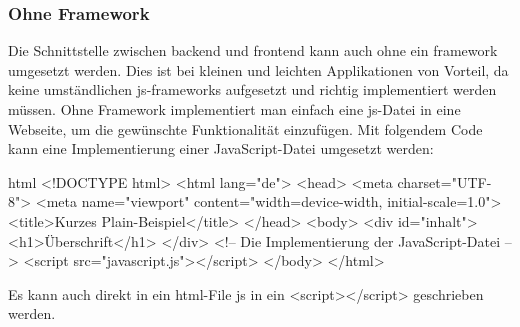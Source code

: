 \subsubsection{Ohne Framework}
Die Schnittstelle zwischen \Gls{backend} und \Gls{frontend} kann auch ohne ein \Gls{framework} umgesetzt werden. Dies ist bei kleinen und leichten Applikationen von Vorteil, da keine umständlichen \Gls{js}-\Gls{framework}s aufgesetzt und richtig implementiert werden müssen. Ohne Framework implementiert man einfach eine \Gls{js}-Datei in eine Webseite, um die gewünschte Funktionalität einzufügen. Mit folgendem Code kann eine Implementierung einer JavaScript-Datei umgesetzt werden:
\begin{code}{html}
	<!DOCTYPE html>
	<html lang="de">
		<head>
			<meta charset="UTF-8">
			<meta name="viewport" content="width=device-width, initial-scale=1.0">
			<title>Kurzes Plain-Beispiel</title>
		</head>
		<body>
			<div id="inhalt">
				<h1>Überschrift</h1>
			</div>
			<!-- Die Implementierung der JavaScript-Datei -->
			<script src="javascript.js"></script>
		</body>
	</html>
\end{code}
Es kann auch direkt in ein \Gls{html}-File \Gls{js} in ein <script></script> geschrieben werden.

